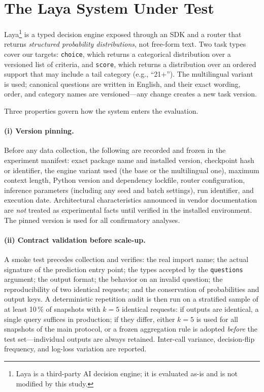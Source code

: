\documentclass[11pt]{article}
\begin{document}
\section{The Laya System Under Test}
\label{sec:laya}

Laya\footnote{Laya is a third-party AI decision engine; it is evaluated as-is
and is not modified by this study.} is a typed decision engine exposed through
an SDK and a router that returns \emph{structured probability distributions},
not free-form text. Two task types cover our targets: \texttt{choice}, which
returns a categorical distribution over a versioned list of criteria, and
\texttt{score}, which returns a distribution over an ordered support that may
include a tail category (e.g., ``21+''). The multilingual variant is used;
canonical questions are written in English, and their exact wording, order,
and category names are versioned---any change creates a new task version.

Three properties govern how the system enters the evaluation.

\paragraph{(i) Version pinning.}
Before any data collection, the following are recorded and frozen in the
experiment manifest: exact package name and installed version, checkpoint hash
or identifier, the engine variant used (the base or the multilingual one), maximum
context length, Python version and dependency lockfile, router configuration,
inference parameters (including any seed and batch settings), run identifier,
and execution date. Architectural characteristics announced in vendor
documentation are \emph{not} treated as experimental facts until verified in
the installed environment. The pinned version is used for all confirmatory
analyses.

\paragraph{(ii) Contract validation before scale-up.}
A smoke test precedes collection and verifies: the real import name; the
actual signature of the prediction entry point; the types accepted by the
\texttt{questions} argument; the output format; the behavior on an invalid
question; the reproducibility of two identical requests; and the conservation
of probabilities and output keys. A deterministic repetition audit is then run
on a stratified sample of at least 10\,\% of snapshots with $k=5$ identical
requests: if outputs are identical, a single query suffices in production; if
they differ, either $k=5$ is used for all snapshots of the main protocol, or a
frozen aggregation rule is adopted \emph{before} the test set---individual
outputs are always retained. Inter-call variance, decision-flip frequency,
and log-loss variation are reported.
\end{document}
